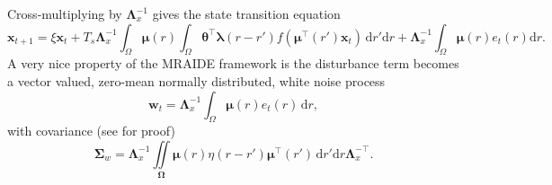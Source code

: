 \documentclass[review,authoryear,3p]{elsarticle}
\begin{document}
Cross-multiplying by $\mathbf{\Lambda}_{x}^{-1}$ gives the state transition equation
\begin{equation}\label{eq:ApproxDiscreteTimeModel4}
	\mathbf{x}_{t+1} = 
	\xi \mathbf{x}_t + 
	T_s \mathbf{\Lambda}_{x}^{-1} \int_{\Omega}\boldsymbol\mu\left(r\right)\int_\Omega { 
	    \boldsymbol\theta^\top\boldsymbol\lambda\left(r-r'\right)
	    f\left(\boldsymbol\mu^\top\left(r'\right)\mathbf{x}_t\right) 
	\, \mathrm{d}r'\mathrm{d}r}  
	+ \mathbf{\Lambda}_{x}^{-1}\int_{\Omega}\boldsymbol{\mu}\left(r\right) e_t\left(r\right) \mathrm{d}r.
\end{equation}
A very nice property of the MRAIDE framework is the disturbance term becomes a vector valued, zero-mean normally distributed, white noise process 
\begin{equation}\label{eq:Disturbance}
\mathbf w_t= \mathbf{\Lambda}_{x}^{-1}\int_{\Omega}\boldsymbol\mu \left(r\right)e_t\left(r\right)\,\mathrm{d}r,
\end{equation}
with covariance (see \citep{Freestone2011} for proof)
\begin{equation}\label{eq:CovMatrix}
\boldsymbol\Sigma_w =\mathbf{\Lambda}_{x}^{-1}\iint\limits_{\boldsymbol\Omega}\boldsymbol\mu\left(r\right) \eta\left(r-r'\right)\boldsymbol\mu^{\top}\left(r'\right)\,\mathrm{d}r'\mathrm{d}r\mathbf{\Lambda}_{x}^{-\top}.
\end{equation} 
\end{document}

